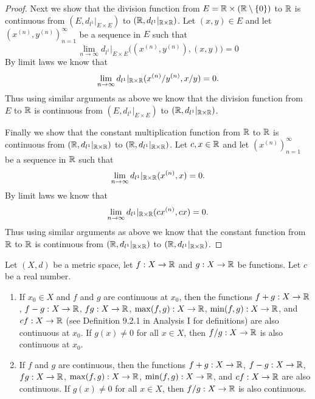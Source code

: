 \begin{proof}
  Next we show that the division function from \(E = \mathbb{R} \times (\mathbb{R} \setminus \{0\})\) to \(\mathbb{R}\) is continuous from \((E, d_{l^1}|_{E \times E})\) to \((\mathbb{R}, d_{l^1}|_{\mathbb{R} \times \mathbb{R}})\).
  Let \((x, y) \in E\) and let \((x^{(n)}, y^{(n)})_{n = 1}^\infty\) be a sequence in \(E\) such that
  \[
    \lim_{n \to \infty} d_{l^1}|_{E \times E}\big((x^{(n)}, y^{(n)}), (x, y)\big) = 0
  \]
  By limit laws we know that
  \[
    \lim_{n \to \infty} d_{l^1}|_{\mathbb{R} \times \mathbb{R}}(x^{(n)} / y^{(n)}, x / y) = 0.
  \]
  Thus using similar arguments as above we know that the division function from \(E\) to \(\mathbb{R}\) is continuous from \((E, d_{l^1}|_{E \times E})\) to \((\mathbb{R}, d_{l^1}|_{\mathbb{R} \times \mathbb{R}})\).

  Finally we show that the constant multiplication function from \(\mathbb{R}\) to \(\mathbb{R}\) is continuous from \((\mathbb{R}, d_{l^1}|_{\mathbb{R} \times \mathbb{R}})\) to \((\mathbb{R}, d_{l^1}|_{\mathbb{R} \times \mathbb{R}})\).
  Let \(c, x \in \mathbb{R}\) and let \((x^{(n)})_{n = 1}^\infty\) be a sequence in \(\mathbb{R}\) such that
  \[
    \lim_{n \to \infty} d_{l^1}|_{\mathbb{R} \times \mathbb{R}}(x^{(n)}, x) = 0.
  \]
  By limit laws we know that
  \[
    \lim_{n \to \infty} d_{l^1}|_{\mathbb{R} \times \mathbb{R}}(cx^{(n)}, cx) = 0.
  \]
  Thus using similar arguments as above we know that the constant function from \(\mathbb{R}\) to \(\mathbb{R}\) is continuous from \((\mathbb{R}, d_{l^1}|_{\mathbb{R} \times \mathbb{R}})\) to \((\mathbb{R}, d_{l^1}|_{\mathbb{R} \times \mathbb{R}})\).
\end{proof}

\begin{cor}\label{2.2.3}
  Let \((X, d)\) be a metric space, let \(f : X \to \mathbb{R}\) and \(g : X \to \mathbb{R}\) be functions.
  Let \(c\) be a real number.
  \begin{enumerate}
    \item If \(x_0 \in X\) and \(f\) and \(g\) are continuous at \(x_0\), then the functions \(f + g : X \to \mathbb{R}\), \(f - g : X \to \mathbb{R}\), \(fg : X \to \mathbb{R}\), \(\max(f, g) : X \to \mathbb{R}\), \(\min(f, g) : X \to \mathbb{R}\), and \(cf : X \to \mathbb{R}\) (see Definition 9.2.1 in Analysis I for definitions) are also continuous at \(x_0\).
          If \(g(x) \neq 0\) for all \(x \in X\), then \(f / g : X \to \mathbb{R}\) is also continuous at \(x_0\).
    \item If \(f\) and \(g\) are continuous, then the functions \(f + g : X \to \mathbb{R}\), \(f - g : X \to \mathbb{R}\), \(fg : X \to \mathbb{R}\), \(\max(f, g) : X \to \mathbb{R}\), \(\min(f, g) : X \to \mathbb{R}\), and \(cf : X \to \mathbb{R}\) are also continuous.
          If \(g(x) \neq 0\) for all \(x \in X\), then \(f / g : X \to \mathbb{R}\) is also continuous.
  \end{enumerate}
\end{cor}

